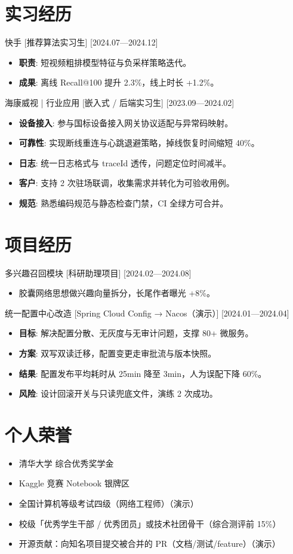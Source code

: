 \documentclass{resume-photo}
\begin{document}
\section{实习经历}
\ResumeItem
{快手}
[\textnormal{推荐算法实习生}]
[2024.07—2024.12]

\begin{itemize}
  \item \textbf{职责}: 短视频粗排模型特征与负采样策略迭代。
  \item \textbf{成果}: 离线 Recall@100 提升 2.3\%，线上时长 +1.2\%。
\end{itemize}


\ResumeItem
{海康威视 | 行业应用}
[\textnormal{嵌入式 / 后端实习生}]
[2023.09—2024.02]

\begin{itemize}
  \item \textbf{设备接入}: 参与国标设备接入网关协议适配与异常码映射。
  \item \textbf{可靠性}: 实现断线重连与心跳退避策略，掉线恢复时间缩短 40\%。
  \item \textbf{日志}: 统一日志格式与 traceId 透传，问题定位时间减半。
  \item \textbf{客户}: 支持 2 次驻场联调，收集需求并转化为可验收用例。
  \item \textbf{规范}: 熟悉编码规范与静态检查门禁，CI 全绿方可合并。
\end{itemize}



\section{项目经历}
\ResumeItem
{多兴趣召回模块}
[\textnormal{科研助理项目}]
[2024.02—2024.08]

\begin{itemize}
  \item 胶囊网络思想做兴趣向量拆分，长尾作者曝光 +8\%。
\end{itemize}


\ResumeItem
{统一配置中心改造}
[\textnormal{Spring Cloud Config → Nacos（演示）}]
[2024.01—2024.04]

\begin{itemize}
  \item \textbf{目标}: 解决配置分散、无灰度与无审计问题，支撑 80+ 微服务。
  \item \textbf{方案}: 双写双读迁移，配置变更走审批流与版本快照。
  \item \textbf{结果}: 配置发布平均耗时从 25min 降至 3min，人为误配下降 60\%。
  \item \textbf{风险}: 设计回滚开关与只读兜底文件，演练 2 次成功。
\end{itemize}



\section{个人荣誉}
\begin{itemize}
  \item 清华大学 综合优秀奖学金
  \item Kaggle 竞赛 Notebook 银牌区
  \item 全国计算机等级考试四级（网络工程师）（演示）
  \item 校级「优秀学生干部 / 优秀团员」或技术社团骨干（综合测评前 15\%）
  \item 开源贡献：向知名项目提交被合并的 PR（文档/测试/feature）（演示）
\end{itemize}
\end{document}
